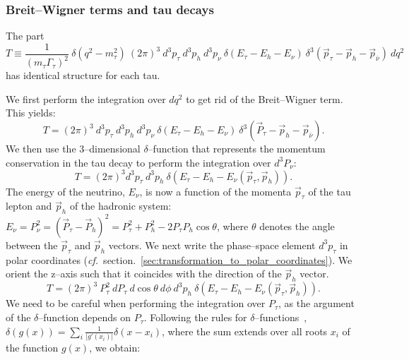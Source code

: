 \subsubsection{Breit--Wigner terms and tau decays}

The part
\begin{equation*}
T \equiv \frac{1}{(m_{\tau}\Gamma_{\tau})^{2}} \ \delta(q^2 - m_{\tau}^2) 
  \ (2\pi)^3 \ d^3p_{\tau} \ d^3p_{h} \ d^3p_{\nu} \ \delta(E_{\tau} - E_{h} - E_{\nu}) \ \delta^3(\vec{p}_{\tau} - \vec{p}_{h} - \vec{p}_{\bar{\nu}}) \ dq^2
\end{equation*}
has identical structure for each tau.

We first perform the integration over $dq^2$ to get rid of the Breit--Wigner term. 
This yields:
\begin{equation*}
T = (2\pi)^3 \ d^3p_{\tau} \ d^3p_{h} \ d^3p_{\nu} \ \delta(E_{\tau} - E_{h} - E_{\nu}) \ \delta^3(\vec{P}_{\tau} - \vec{p}_{h} - \vec{p}_{\bar{\nu}}).
\end{equation*}
We then use the 3--dimensional $\delta$--function that represents the momentum conservation in the tau decay to perform the integration over $d^3P_{\nu}$:
\begin{equation*}
T = (2\pi)^3 d^3p_{\tau} \ d^3p_{h} \ \delta(E_{\tau} - E_{h} - E_{\nu}(\vec{p}_{\tau}, \vec{p}_{h})). 
\end{equation*}
The energy of the neutrino, $E_{\nu}$, is now a function of the momenta $\vec{p}_{\tau}$ of the tau lepton and $\vec{p}_{h}$ of the hadronic system:
$E_{\nu} = P_{\nu}^2 = (\vec{P}_{\tau} - \vec{P}_{h})^2 = P_{\tau}^2 + P_{h}^2 - 2 P_{\tau} P_{h} \cos\theta$,
where $\theta$ denotes the angle between the $\vec{p}_{\tau}$ and $\vec{p}_{h}$ vectors.
We next write the phase--space element $d^3p_{\tau}$ in polar coordinates ({\it cf.}\ section.~\ref{sec:transformation_to_polar_coordinates}).
We orient the z--axis such that it coincides with the direction of the $\vec{p}_{h}$ vector.
\begin{equation*}
T = (2\pi)^3 \ P_{\tau}^2 \ dP_{\tau} \ d\cos\theta \ d\phi \ d^3p_{h} \ \delta(E_{\tau} - E_{h} - E_{\nu}(\vec{p}_{\tau}, \vec{p}_{h})). 
\end{equation*}
We need to be careful when performing the integration over $P_{\tau}$, as the argument of the $\delta$--function depends on $P_{\tau}$.
Following the rules for $\delta$--functions~\cite{deltaFunctionRules}, $\delta(g(x)) = \sum_{i} \frac{1}{\vert g'(x_i) \vert} \delta(x - x_{i})$,
where the sum extends over all roots $x_{i}$ of the function $g(x)$, we obtain:
